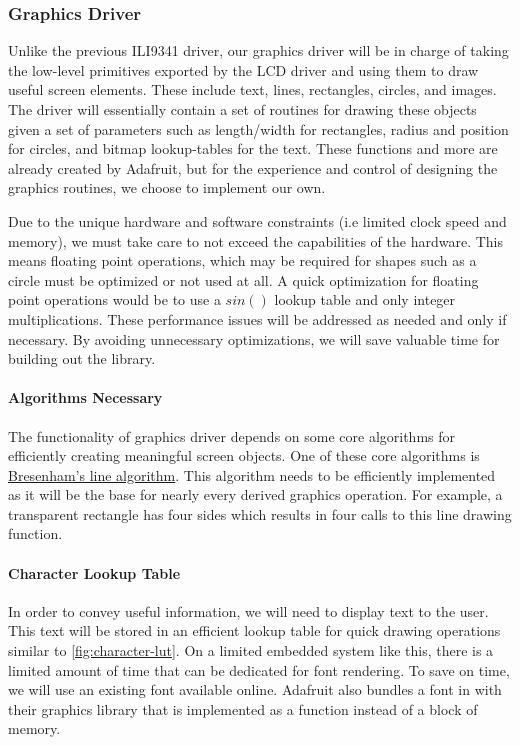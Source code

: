 
\subsubsection{Graphics Driver}
Unlike the previous ILI9341 driver, our graphics driver will be in charge of
taking the low-level primitives exported by the LCD driver and using them to
draw useful screen elements. These include text, lines, rectangles, circles,
and images. The driver will essentially contain a set of routines for drawing
these objects given a set of parameters such as length/width for rectangles,
radius and position for circles, and bitmap lookup-tables for the text. These
functions and more are already created by Adafruit, but for the experience and
control of designing the graphics routines, we choose to implement our own.

Due to the unique hardware and software constraints (i.e limited clock speed
and memory), we must take care to not exceed the capabilities of the hardware.
This means floating point operations, which may be required for shapes such as
a circle must be optimized or not used at all. A quick optimization for
floating point operations would be to use a $sin()$ lookup table and only
integer multiplications. These performance issues will be addressed as needed
and only if necessary. By avoiding unnecessary optimizations, we will save
valuable time for building out the library.

\paragraph{Algorithms Necessary}
The functionality of graphics driver depends on some core algorithms for
efficiently creating meaningful screen objects. One of these core algorithms is
\href{https://en.wikipedia.org/wiki/Bresenham\%27s_line_algorithm}{Bresenham's
line algorithm}. This algorithm needs to be efficiently implemented as it will
be the base for nearly every derived graphics operation. For example, a
transparent rectangle has four sides which results in four calls to this line
drawing function.

\paragraph{Character Lookup Table}
In order to convey useful information, we will need to display text to the
user. This text will be stored in an efficient lookup table for quick drawing
operations similar to \autoref{fig:character-lut}. On a limited embedded
system like this, there is a limited amount of time that can be dedicated for
font rendering. To save on time, we will use an existing font available online.
Adafruit also bundles a font in with their graphics library that is implemented
as a function instead of a block of memory.

